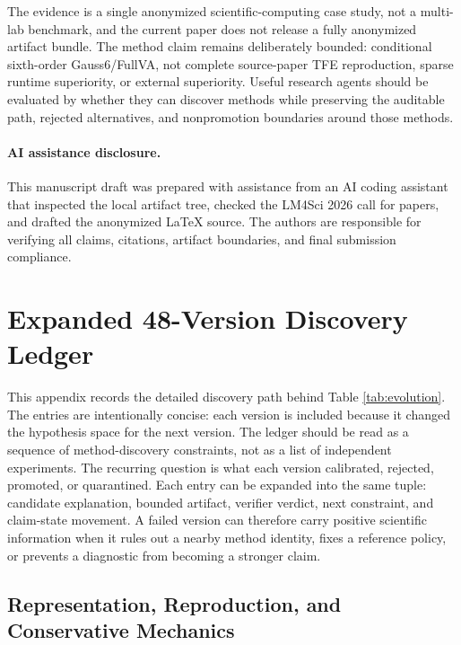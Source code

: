 \documentclass[10pt]{article}
\newcommand{\method}{Gauss6/\allowbreak FullVA}
\newcommand{\tfe}{TFE}
\begin{document}
The evidence is a single anonymized scientific-computing case study, not a
multi-lab benchmark, and the current paper does not release a fully anonymized
artifact bundle. The method claim remains deliberately bounded: conditional
sixth-order \method{}, not complete source-paper \tfe{} reproduction, sparse
runtime superiority, or external superiority. Useful research agents should be
evaluated by whether they can discover methods while preserving the auditable
path, rejected alternatives, and nonpromotion boundaries around those methods.

\paragraph{AI assistance disclosure.}
This manuscript draft was prepared with assistance from an AI coding assistant
that inspected the local artifact tree, checked the LM4Sci 2026 call for
papers, and drafted the anonymized LaTeX source. The authors are responsible
for verifying all claims, citations, artifact boundaries, and final submission
compliance.




\clearpage
\appendix

\section{Expanded 48-Version Discovery Ledger}

This appendix records the detailed discovery path behind Table
\ref{tab:evolution}. The entries are intentionally concise: each version is
included because it changed the hypothesis space for the next version. The
ledger should be read as a sequence of method-discovery constraints, not as a
list of independent experiments. The recurring question is what each version
calibrated, rejected, promoted, or quarantined. Each entry can be expanded into
the same tuple: candidate explanation, bounded artifact, verifier verdict, next
constraint, and claim-state movement. A failed version can therefore carry
positive scientific information when it rules out a nearby method identity,
fixes a reference policy, or prevents a diagnostic from becoming a stronger
claim.

\subsection{Representation, Reproduction, and Conservative Mechanics}
\end{document}
